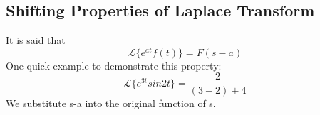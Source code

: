 \documentclass{article}
\begin{document}
\subsection{Shifting Properties of Laplace Transform}
It is said that
\begin{equation*}
	\mathcal{L}\{e^{at}f(t)\} = F(s-a)
\end{equation*}
One quick example to demonstrate this property:
\begin{equation*}
	\mathcal{L}\{e^{3t}sin2t\} = \frac{2}{(3-2)+4}
\end{equation*}
We substitute s-a into the original function of s.
\end{document}

